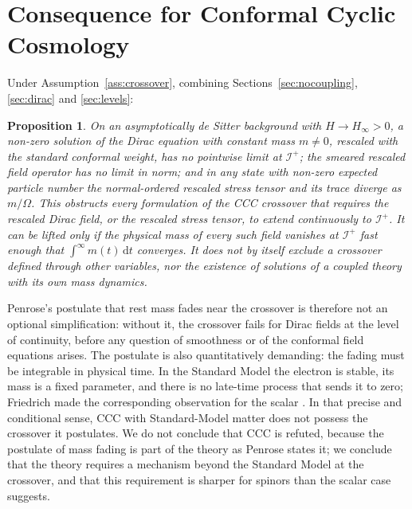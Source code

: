 \documentclass[11pt,a4paper]{article}
\newtheorem{proposition}{Proposition}
\theoremstyle{definition}
\newcommand{\scri}{\mathscr{I}^{+}}
\newcommand{\dd}{\mathrm{d}}
\begin{document}
\section{Consequence for Conformal Cyclic Cosmology}
\label{sec:ccc}

Under Assumption~\ref{ass:crossover}, combining Sections~\ref{sec:nocoupling}, \ref{sec:dirac} and \ref{sec:levels}:

\begin{proposition}
\label{prop:ccc}
On an asymptotically de Sitter background with $H\to H_{\infty}>0$, a non-zero solution of the Dirac equation with constant mass $m\neq0$, rescaled with the standard conformal weight, has no pointwise limit at $\scri$; the smeared rescaled field operator has no limit in norm; and in any state with non-zero expected particle number the normal-ordered rescaled stress tensor and its trace diverge as $m/\Omega$. This obstructs every formulation of the CCC crossover that requires the rescaled Dirac field, or the rescaled stress tensor, to extend continuously to $\scri$. It can be lifted only if the physical mass of every such field vanishes at $\scri$ fast enough that $\int^{\infty}m(t)\,\dd t$ converges. It does not by itself exclude a crossover defined through other variables, nor the existence of solutions of a coupled theory with its own mass dynamics.
\end{proposition}

Penrose's postulate that rest mass fades near the crossover \cite{Penrose2010} is therefore not an optional simplification: without it, the crossover fails for Dirac fields at the level of continuity, before any question of smoothness or of the conformal field equations arises. The postulate is also quantitatively demanding: the fading must be integrable in physical time. In the Standard Model the electron is stable, its mass is a fixed parameter, and there is no late-time process that sends it to zero; Friedrich made the corresponding observation for the scalar \cite{Friedrich2014}. In that precise and conditional sense, CCC with Standard-Model matter does not possess the crossover it postulates. We do not conclude that CCC is refuted, because the postulate of mass fading is part of the theory as Penrose states it; we conclude that the theory requires a mechanism beyond the Standard Model at the crossover, and that this requirement is sharper for spinors than the scalar case suggests.
\end{document}
